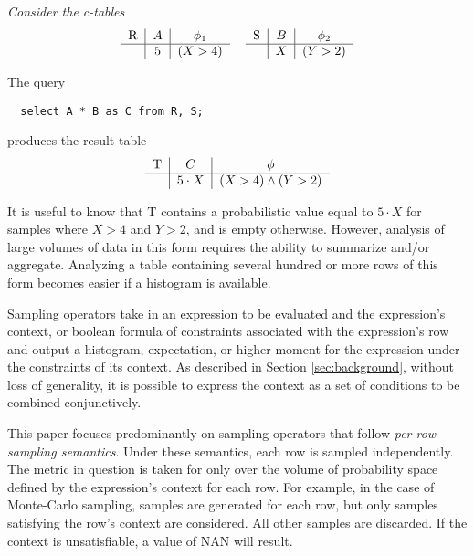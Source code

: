 \begin{example}\em
Consider the c-tables 
\[
\begin{tabular}{lr}
\begin{tabular}{c|c|c}
R & $A$ & $\phi_1$\\
\hline
& $5$ & $(X > 4)$ 
\end{tabular} & \begin{tabular}{c|c|c}
 S & $B$ & $\phi_2$ \\
\hline
& $X$ & $(Y > 2)$
\end{tabular}
\end{tabular}
\]

The query {\small\begin{verbatim}
  select A * B as C from R, S;
\end{verbatim}} produces the result table
\[
\begin{tabular}{c|c|c}
T & $C$ & $\phi$\\
\hline
& $5\cdot X$ & $(X > 4) \wedge (Y > 2)$ 
\end{tabular}
\]

It is useful to know that T contains a probabilistic value equal to $5 \cdot X$ for samples where $X > 4$ and $Y > 2$, and is empty otherwise.  However, analysis of large volumes of data in this form requires the ability to summarize and/or aggregate.  Analyzing a table containing several hundred or more rows of this form becomes easier if a histogram is available.
\end{example}

Sampling operators take in an expression to be evaluated and the expression's context, or boolean formula of constraints associated with the expression's row and output a histogram, expectation, or higher moment for the expression under the constraints of its context.  As described in Section \ref{sec:background}, without loss of generality, it is possible to express the context as a set of conditions to be combined conjunctively.  

This paper focuses predominantly on sampling operators that follow \textit{per-row sampling semantics}.  Under these semantics, each row is sampled independently.  The metric in question is taken for only over the volume of probability space defined by the expression's context for each row.  For example, in the case of Monte-Carlo sampling, samples are generated for each row, but only samples satisfying the row's context are considered.  All other samples are discarded.  If the context is unsatisfiable, a value of NAN will result.

